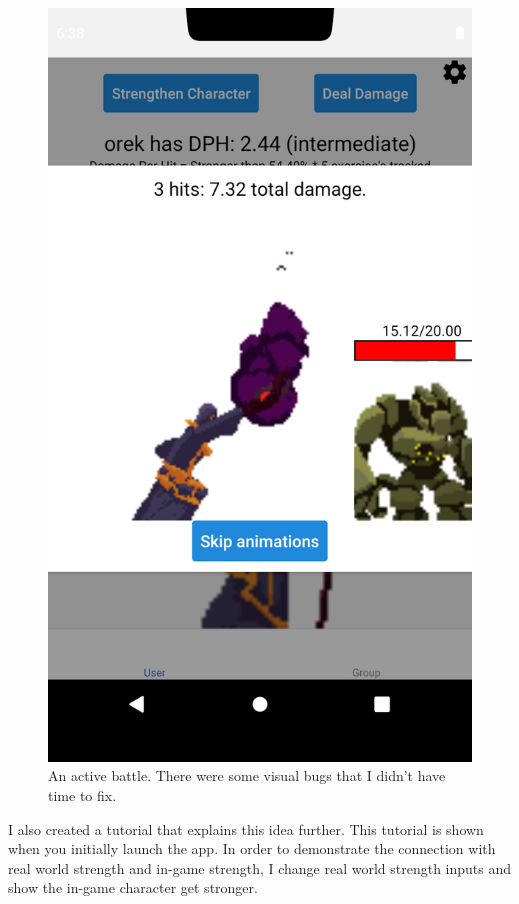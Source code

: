 \documentclass{l4proj}
\begin{document}
\begin{figure}[H]
    \centering
    \includegraphics[width=0.7\linewidth]{attack.png}    
    \caption{ An active battle. There were some visual bugs that I didn't have time to fix.  }
\end{figure}

\newpage

I also created a tutorial that explains this idea further. This tutorial is shown when you initially launch the app. In order to demonstrate the connection with real world strength and in-game strength, I change real world strength inputs and show the in-game character get stronger.
\end{document}
